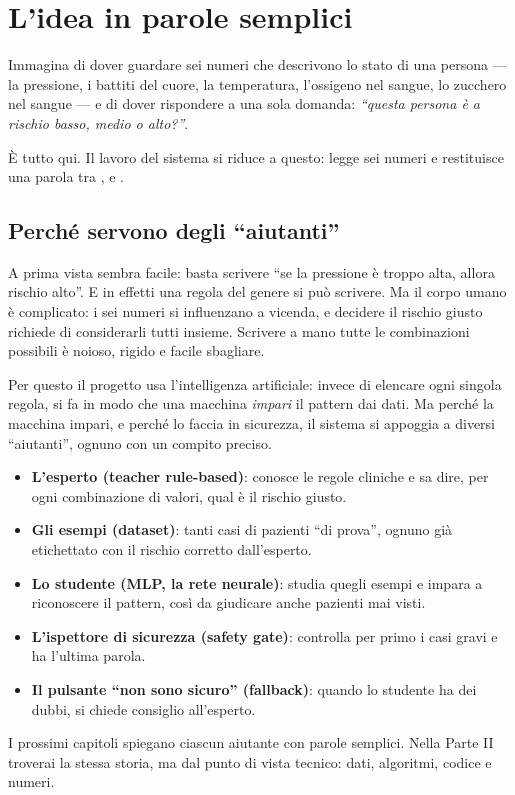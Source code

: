 \chapter{L'idea in parole semplici}\label{cap:p1-idea}


Immagina di dover guardare sei numeri che descrivono lo stato di una persona
--- la pressione, i battiti del cuore, la temperatura, l'ossigeno nel sangue,
lo zucchero nel sangue --- e di dover rispondere a una sola domanda:
\emph{``questa persona è a rischio basso, medio o alto?''}.

È tutto qui. Il lavoro del sistema si riduce a questo: legge sei numeri e
restituisce una parola tra ,  e .

\section{Perché servono degli ``aiutanti''}\label{sec:p1-perche-aiutanti}

A prima vista sembra facile: basta scrivere ``se la pressione è troppo alta,
allora rischio alto''. E in effetti una regola del genere si può scrivere. Ma
il corpo umano è complicato: i sei numeri si influenzano a vicenda, e decidere
il rischio giusto richiede di considerarli tutti insieme. Scrivere a mano
tutte le combinazioni possibili è noioso, rigido e facile sbagliare.

Per questo il progetto usa l'intelligenza artificiale: invece di elencare
ogni singola regola, si fa in modo che una macchina \emph{impari} il pattern
dai dati. Ma perché la macchina impari, e perché lo faccia in sicurezza, il
sistema si appoggia a diversi ``aiutanti'', ognuno con un compito preciso.

\begin{itemize}
  \item \textbf{L'esperto (teacher rule-based)}: conosce le regole cliniche e
        sa dire, per ogni combinazione di valori, qual è il rischio giusto.
  \item \textbf{Gli esempi (dataset)}: tanti casi di pazienti ``di prova'',
        ognuno già etichettato con il rischio corretto dall'esperto.
  \item \textbf{Lo studente (MLP, la rete neurale)}: studia quegli esempi e
        impara a riconoscere il pattern, così da giudicare anche pazienti mai
        visti.
  \item \textbf{L'ispettore di sicurezza (safety gate)}: controlla per primo i
        casi gravi e ha l'ultima parola.
  \item \textbf{Il pulsante ``non sono sicuro'' (fallback)}: quando lo studente
        ha dei dubbi, si chiede consiglio all'esperto.
\end{itemize}

I prossimi capitoli spiegano ciascun aiutante con parole semplici. Nella
Parte II troverai la stessa storia, ma dal punto di vista tecnico: dati,
algoritmi, codice e numeri.
